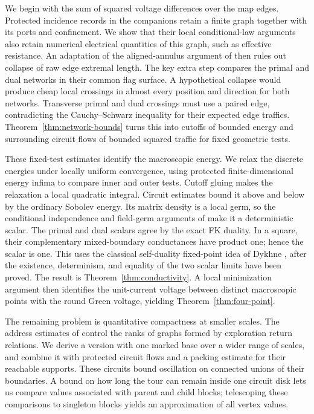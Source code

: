 We begin with the sum of squared voltage differences over the map edges.
Protected incidence records in the companions retain a finite graph together
with its ports and confinement.  We show that their local conditional-law
arguments also retain numerical electrical quantities of this graph, such
as effective resistance.  An adaptation of the aligned-annulus argument of
\cite[Section~8]{C} then rules out collapse of raw edge extremal length.
The key extra step compares the primal and dual networks in their common
flag surface.  A hypothetical collapse would produce cheap local crossings
in almost every position and direction for both networks.  Transverse
primal and dual crossings must use a paired edge, contradicting the
Cauchy--Schwarz inequality for their expected edge traffics.
Theorem~\ref{thm:network-bounds} turns this into cutoffs of bounded energy
and surrounding circuit flows of bounded squared traffic for fixed
geometric tests.

These fixed-test estimates identify the macroscopic energy.  We relax the
discrete energies under locally uniform convergence, using protected
finite-dimensional energy infima to compare inner and outer tests.  Cutoff
gluing makes the relaxation a local quadratic integral.  Circuit estimates
bound it above and below by the ordinary Sobolev energy.  Its matrix density
is a local germ, so the conditional independence and field-germ arguments
of \cite{C} make it a deterministic scalar.  The primal and dual scalars
agree by the exact FK duality.  In a square, their complementary
mixed-boundary conductances have product one; hence the scalar is one.
This uses the classical self-duality fixed-point idea of Dykhne
\cite{Dykhne1971}, after the existence, determinism, and equality of the two
scalar limits have been proved.  The result is
Theorem~\ref{thm:conductivity}.  A local minimization argument then
identifies the unit-current voltage between distinct macroscopic points
with the round Green voltage, yielding Theorem~\ref{thm:four-point}.

The remaining problem is quantitative compactness at smaller scales.
The address estimates of \cite{P} control the ranks of graphs formed by
exploration return relations.  We derive a version with one marked base
over a wider range of scales, and combine it with protected circuit flows
and a packing estimate for their reachable supports.  These circuits bound
oscillation on connected unions of their boundaries.  A bound on how long
the tour can remain inside one circuit disk lets us compare values associated
with parent and child blocks; telescoping these comparisons to singleton
blocks yields an approximation of all vertex values.

